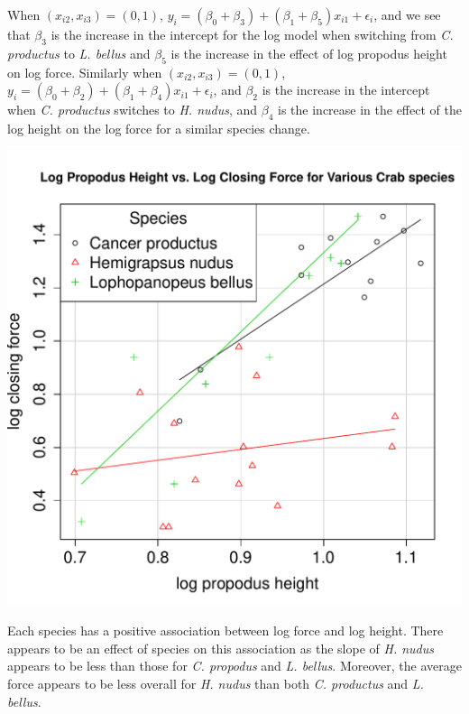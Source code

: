 \documentclass{homework}
\begin{document}
\begin{longproblem}
\begin{solution}
    
    When $(x_{i2},x_{i3}) =
    (0,1)$, $y_i = (\beta_0+\beta_3) +(\beta_1+\beta_5)x_{i1} +
    \epsilon_i$, and we see that $\beta_3$ is the increase in the
    intercept for the log model when switching from \emph{C. productus} to \emph{L.
    bellus} and $\beta_5$ is the increase in the effect of log propodus
    height on log force.  Similarly when $(x_{i2},x_{i3}) = (0,1)$,
    $y_i = (\beta_0+\beta_2) +(\beta_1+\beta_4)x_{i1} + \epsilon_i$,
    and $\beta_2$ is the increase in the intercept when \emph{C.
    productus} switches to \emph{H. nudus}, and $\beta_4$ is the
    increase in the effect of the log height on the log force for a similar
    species change.
    \end{solution}

  \begin{solution}
  \begin{minipage}{.5\textwidth}
  \includegraphics[width=\textwidth]{crab_scatter.pdf}
  \end{minipage}
  \begin{minipage}{.5\textwidth}
  Each species has a positive association between log force and log
  height.  There appears to be an effect of species on this
  association as the slope of \emph{H. nudus} appears to be less
  than those for \emph{C. propodus} and \emph{L. bellus}.  Moreover, the average force appears to be less overall for \emph{H. nudus} than both \emph{C. productus} and \emph{L. bellus}.
  \end{minipage}
  \end{solution}
  

\end{longproblem}
\end{document}
